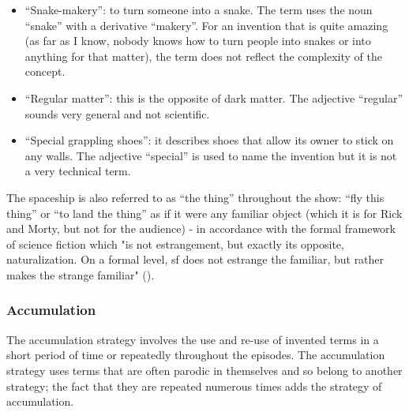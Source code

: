 \documentclass[output=paper]{langscibook}
\begin{document}
\begin{itemize}
\item “Snake-makery”: to turn someone into a snake. The term uses the noun “snake” with a derivative “makery”. For an invention that is quite amazing (as far as I know, nobody knows how to turn people into snakes or into anything for that matter), the term does not reflect the complexity of the concept.
\item “Regular matter”: this is the opposite of dark matter. The adjective “regular” sounds very general and not scientific.
\item “Special grappling shoes”: it describes shoes that allow its owner to stick on any walls. The adjective “special” is used to name the invention but it is not a very technical term.
\end{itemize}

The spaceship is also referred to as “the thing” throughout the show: “fly this thing” or “to land the thing” as if it were any familiar object (which it is for Rick and Morty, but not for the audience) - in accordance with the formal framework of science fiction which "is not estrangement, but exactly its opposite, naturalization. On a formal level, sf does not estrange the familiar, but rather makes the strange familiar" (\citealt{Spiegel2008}).

\subsubsection{Accumulation}

The accumulation strategy involves the use and re-use of invented terms in a short period of time or repeatedly throughout the episodes. The accumulation strategy uses terms that are often parodic in themselves and so belong to another strategy; the fact that they are repeated numerous times adds the strategy of accumulation.
\end{document}
